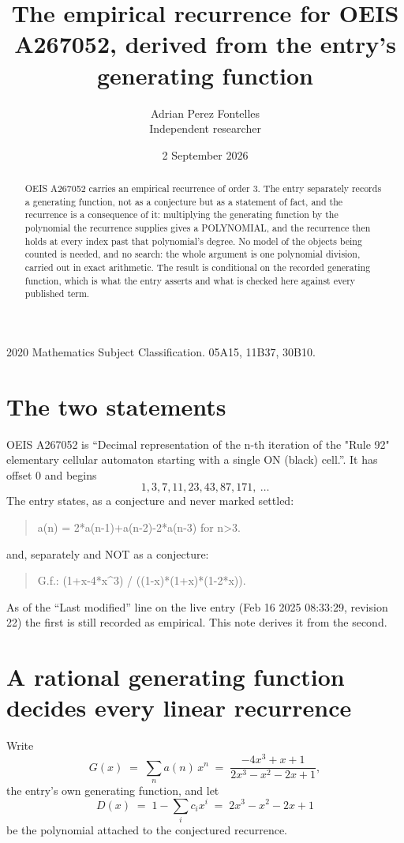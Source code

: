 \documentclass[11pt,a4paper]{article}
\title{The empirical recurrence for OEIS A267052, derived from the entry's generating function}
\author{Adrian Perez Fontelles\\ \small Independent researcher}
\date{2 September 2026}
\theoremstyle{plain}
\theoremstyle{definition}
\begin{document}
\maketitle

\begin{abstract}
OEIS A267052 carries an empirical recurrence of order $3$. The entry separately records a
generating function, not as a conjecture but as a statement of fact, and the recurrence is a
consequence of it: multiplying the generating function by the polynomial the recurrence
supplies gives a POLYNOMIAL, and the recurrence then holds at every index past that
polynomial's degree. No model of the objects being counted is needed, and no search: the
whole argument is one polynomial division, carried out in exact arithmetic. The result is
conditional on the recorded generating function, which is what the entry asserts and what is
checked here against every published term.
\end{abstract}

\noindent\small 2020 Mathematics Subject Classification. 05A15, 11B37, 30B10.\normalsize

\section{The two statements}

OEIS A267052 is ``Decimal representation of the n-th iteration of the "Rule 92" elementary cellular automaton starting with a single ON (black) cell.''. It has offset $0$ and begins
\[
1, 3, 7, 11, 23, 43, 87, 171,\ \dots
\]
The entry states, as a conjecture and never marked settled:
\begin{quote}
a(n) = 2*a(n-1)+a(n-2)-2*a(n-3) for n>3.
\end{quote}
and, separately and NOT as a conjecture:
\begin{quote}
G.f.: (1+x-4*x\^{}3) / ((1-x)*(1+x)*(1-2*x)).
\end{quote}
As of the ``Last modified'' line on the live entry (Feb 16 2025 08:33:29, revision 22) the first is still
recorded as empirical. This note derives it from the second.

\section{A rational generating function decides every linear recurrence}

Write
\[
G(x)\;=\;\sum_{n}a(n)\,x^{n}\;=\;\frac{- 4 x^{3} + x + 1}{2 x^{3} - x^{2} - 2 x + 1},
\]
the entry's own generating function, and let
\[
D(x)\;=\;1-\sum_i c_i x^{i}\;=\;2 x^{3} - x^{2} - 2 x + 1
\]
be the polynomial attached to the conjectured recurrence.
\end{document}
